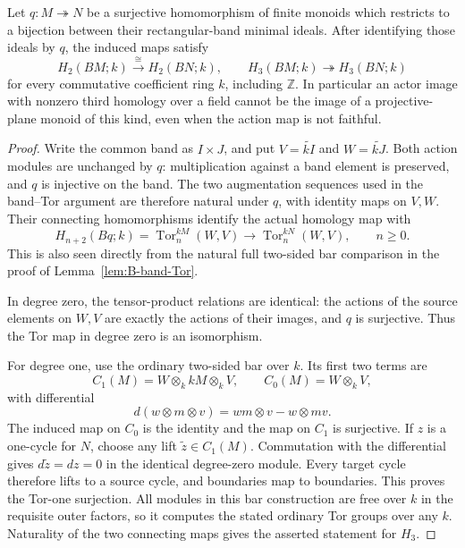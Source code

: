 \begin{lemma}
\label{B:band-quotient-H3-surjection}
Let $q:M\twoheadrightarrow N$ be a surjective homomorphism of
finite monoids which restricts to a bijection between their
rectangular-band minimal ideals.  After identifying those ideals
by $q$, the induced maps satisfy
\[
 H_2(BM;k)\xrightarrow{\ \cong\ }H_2(BN;k),\qquad
 H_3(BM;k)\twoheadrightarrow H_3(BN;k)
\]
for every commutative coefficient ring $k$, including $\mathbb Z$.
In particular an actor image with nonzero third homology over a
field cannot be the image of a projective-plane monoid of this
kind, even when the action map is not faithful.
\end{lemma}
\begin{proof}
Write the common band as $I\times J$, and put
$V=\widetilde{kI}$ and $W=\widetilde{kJ}$.
Both action modules are unchanged by $q$: multiplication against
a band element is preserved, and $q$ is injective on the band.
The two augmentation sequences used in the band--Tor argument
are therefore natural under $q$, with identity maps on $V,W$.
Their connecting homomorphisms identify the actual homology map
with
\[
 H_{n+2}(Bq;k)=
 \operatorname{Tor}^{kM}_n(W,V)\longrightarrow
 \operatorname{Tor}^{kN}_n(W,V),\qquad n\geq0.
\]
This is also seen directly from the natural full two-sided bar
comparison in the proof of Lemma~\ref{lem:B-band-Tor}.

In degree zero, the tensor-product relations are identical:
the actions of the source elements on $W,V$ are exactly the
actions of their images, and $q$ is surjective.  Thus the Tor
map in degree zero is an isomorphism.

For degree one, use the ordinary two-sided bar over $k$.
Its first two terms are
\[
 C_1(M)=W\otimes_k kM\otimes_k V,
 \qquad C_0(M)=W\otimes_k V,
\]
with differential
\[
 d(w\otimes m\otimes v)=wm\otimes v-w\otimes mv.
\]
The induced map on $C_0$ is the identity and the map on $C_1$
is surjective.  If $z$ is a one-cycle for $N$, choose any lift
$\widetilde z\in C_1(M)$.  Commutation with the differential
gives $d\widetilde z=dz=0$ in the identical degree-zero module.
Every target cycle therefore lifts to a source cycle, and
boundaries map to boundaries.  This proves the Tor-one
surjection.  All modules in this bar construction are free over
$k$ in the requisite outer factors, so it computes the stated
ordinary Tor groups over any $k$.  Naturality of the two
connecting maps gives the asserted statement for $H_3$.
\end{proof}
